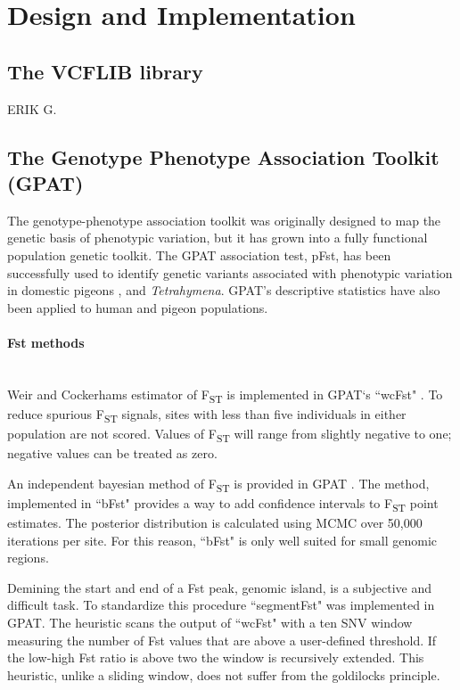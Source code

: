 \documentclass[10pt,letterpaper]{article}
\begin{document}
\section*{Design and Implementation}



\subsection*{The VCFLIB library}

ERIK G.


\subsection*{The Genotype Phenotype Association Toolkit (GPAT)}

The genotype-phenotype association toolkit was originally designed to map the genetic basis of phenotypic variation, but it has grown into a fully functional population genetic toolkit.  The GPAT association test, pFst, has been successfully used to identify genetic variants associated with phenotypic variation in domestic pigeons
 \cite{color},  and \textit{Tetrahymena}\cite{tet}.  GPAT's descriptive statistics have also been applied to human\cite{iron} and pigeon\cite{pigeon} populations.




\paragraph*{Fst methods} \mbox{} \\

Weir and Cockerhams estimator of F\textsubscript{ST} is implemented in GPAT`s ``wcFst" \cite{fst}.  To reduce spurious F\textsubscript{ST} signals, sites with less than five individuals in either population are not scored.  Values of F\textsubscript{ST} will range from slightly negative to one; negative values can be treated as zero. 

An independent bayesian method of F\textsubscript{ST} is provided in GPAT \cite{bfst}.  The method, implemented in ``bFst" provides a way to add confidence intervals to  F\textsubscript{ST} point estimates.  The posterior distribution is calculated using MCMC over 50,000 iterations per site.  For this reason, ``bFst" is only well suited for small genomic regions.


Demining the start and end of a Fst peak, genomic island, is a subjective and difficult task.  To standardize this procedure ``segmentFst" was implemented in GPAT.  The heuristic scans the output of ``wcFst" with a ten SNV window measuring the number of Fst values that are above a user-defined threshold.  If the low-high Fst ratio is above two the window is recursively extended.  This heuristic, unlike a sliding window, does not suffer from the goldilocks principle.
 
\end{document}

